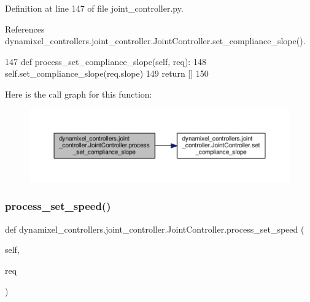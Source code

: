 Definition at line 147 of file joint\+\_\+controller.\+py.



References dynamixel\+\_\+controllers.\+joint\+\_\+controller.\+Joint\+Controller.\+set\+\_\+compliance\+\_\+slope().


\begin{DoxyCode}
147     \textcolor{keyword}{def }process\_set\_compliance\_slope(self, req):
148         self.set\_compliance\_slope(req.slope)
149         \textcolor{keywordflow}{return} []
150 
\end{DoxyCode}
Here is the call graph for this function\+:
\nopagebreak
\begin{figure}[H]
\begin{center}
\leavevmode
\includegraphics[width=350pt]{d3/dcd/classdynamixel__controllers_1_1joint__controller_1_1_joint_controller_a6390c0c20afc0581dd3b1122c894d175_cgraph}
\end{center}
\end{figure}
\mbox{\label{classdynamixel__controllers_1_1joint__controller_1_1_joint_controller_a97af096c1566307859ed168c900fa8a6}} 
\subsubsection{\texorpdfstring{process\+\_\+set\+\_\+speed()}{process\_set\_speed()}}
{\footnotesize\ttfamily def dynamixel\+\_\+controllers.\+joint\+\_\+controller.\+Joint\+Controller.\+process\+\_\+set\+\_\+speed (\begin{DoxyParamCaption}\item[{}]{self,  }\item[{}]{req }\end{DoxyParamCaption})}



